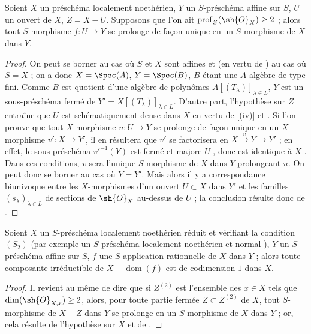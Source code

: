 \begin{proposition}[20.4.11]
\label{IV.20.4.11}
Soient $X$ un préschéma localement noethérien, $Y$ un $S$-préschéma affine sur $S$, $U$ un ouvert de $X$, $Z=X-U$.
Supposons que l'on ait $\operatorname{prof}_Z(\sh{O}_X)\geq 2$  ; alors tout $S$-morphisme $f:U\to Y$ se prolonge de façon unique en un $S$-morphisme de $X$ dans $Y$.
\end{proposition}

\begin{proof}
On peut se borner au cas où $S$ et $X$ sont affines et (en vertu de ) au cas où $S=X$ ; on a donc $X=\Spec(A)$, $Y=\Spec(B)$, $B$ étant une $A$-algèbre de type fini.
Comme $B$ est quotient d'une algèbre de polynômes $A[(T_\lambda)]_{\lambda\in L}$, $Y$ est un sous-préschéma fermé de $Y'=X[(T_\lambda)]_{\lambda\in L}$.
D'autre part, l'hypothèse sur $Z$ entraîne que $U$ est schématiquement dense dans $X$ en vertu de [(iv)] et .
Si l'on prouve que tout $X$-morphisme $u:U\to Y$ se prolonge de façon unique en un $X$-morphisme $v':X\to Y'$, il en résultera que $v'$ se factorisera en $X\xrightarrow{v}Y\to Y'$ ; en effet, le sous-préschéma $v'^{-1}(Y)$ est fermé et majore $U$ , donc est identique à $X$ .
Dans ces conditions, $v$ sera l'unique $S$-morphisme de $X$ dans $Y$ prolongeant $u$.
On peut donc se borner au cas où $Y=Y'$.
Mais alors il y a correspondance biunivoque entre les $X$-morphismes d'un ouvert $U\subset X$ dans $Y'$ et les familles $(s_\lambda)_{\lambda\in L}$ de sections de $\sh{O}_X$ au-dessus de $U$  ; la conclusion résulte donc de .
\end{proof}

\begin{corollary}[20.4.12]
\label{IV.20.4.12}
Soient $X$ un $S$-préschéma localement noethérien réduit et vérifiant la condition $(S_2)$  (par exemple un $S$-préschéma localement noethérien et normal ), $Y$ un $S$-préschéma affine sur $S$, $f$ une $S$-application rationnelle de $X$ dans $Y$ ; alors toute composante irréductible de $X-\operatorname{dom}(f)$ est de codimension $1$ dans $X$.
\end{corollary}

\begin{proof}
Il revient au même de dire que si $Z^{(2)}$ est l'ensemble des $x\in X$ tels que $\dim(\sh{O}_{X,x})\geq 2$, alors, pour toute partie fermée $Z\subset Z^{(2)}$ de $X$, tout $S$-morphisme de $X-Z$ dans $Y$ se prolonge en un $S$-morphisme de $X$ dans $Y$ ; or, cela résulte de l'hypothèse sur $X$  et de .
\end{proof}

